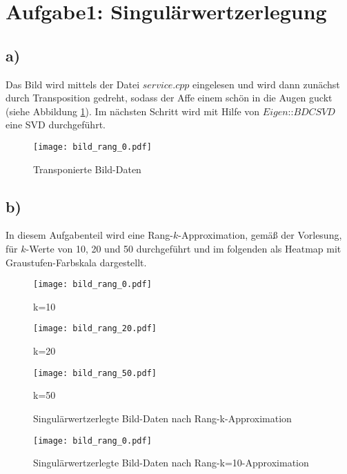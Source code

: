 



\maketitle

\section*{Aufgabe1: Singulärwertzerlegung}
\subsection*{a)}
Das Bild wird mittels der Datei $\textit{service.cpp}$ eingelesen und wird dann
zunächst durch Transposition gedreht, sodass der Affe einem schön in die Augen
guckt (siehe Abbildung \ref{fig:1a}). Im nächsten Schritt wird mit Hilfe von
$\textit{Eigen::BDCSVD}$ eine SVD durchgeführt.

\begin{figure}[h]
    \centering
    \texttt{[image: bild\_rang\_0.pdf]}
    \caption{Transponierte Bild-Daten}
    \label{fig:1a}
\end{figure}

\subsection*{b)}
In diesem Aufgabenteil wird eine Rang-$k$-Approximation, gemäß der Vorlesung,
für $k$-Werte von  10, 20 und 50 durchgeführt und im folgenden als Heatmap mit
Graustufen-Farbskala dargestellt.

\begin{figure}[!htb]
\texttt{[image: bild\_rang\_0.pdf]}
\caption*{k=10}
\label{fig:1b_10}
\endminipage\hfill
{}
\texttt{[image: bild\_rang\_20.pdf]}
\caption*{k=20}
\label{fig:1b_20}
\endminipage\hfill
{}%
\texttt{[image: bild\_rang\_50.pdf]}
\caption*{k=50}
\label{fig:1b_50}
\endminipage
\caption{Singulärwertzerlegte Bild-Daten nach Rang-k-Approximation}
\end{figure}

\begin{figure}[h]
    \centering
    \texttt{[image: bild\_rang\_0.pdf]}
    \caption{Singulärwertzerlegte Bild-Daten nach Rang-k=10-Approximation}
    \label{fig:1b_10}
\end{figure}

